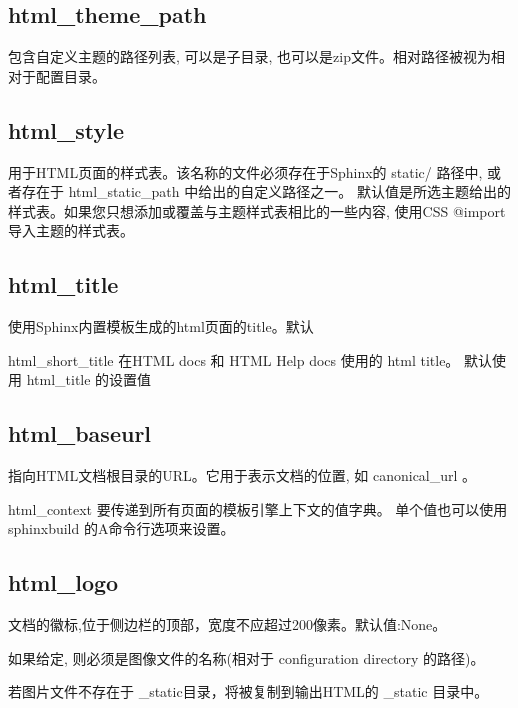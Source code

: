 \documentclass[a4paper,10pt,english]{sphinxmanual}
\begin{document}
\subsection{html\_theme\_path}
\label{\detokenize{sphinx_conf:html-theme-path}}
\sphinxAtStartPar
包含自定义主题的路径列表, 可以是子目录, 也可以是zip文件。相对路径被视为相对于配置目录。


\subsection{html\_style}
\label{\detokenize{sphinx_conf:html-style}}
\sphinxAtStartPar
用于HTML页面的样式表。该名称的文件必须存在于Sphinx的 static/ 路径中, 或者存在于 html\_static\_path 中给出的自定义路径之一。
默认值是所选主题给出的样式表。如果您只想添加或覆盖与主题样式表相比的一些内容, 使用CSS @import 导入主题的样式表。


\subsection{html\_title}
\label{\detokenize{sphinx_conf:html-title}}
\sphinxAtStartPar
使用Sphinx内置模板生成的html页面的title。默认 

\sphinxAtStartPar
html\_short\_title
在HTML docs 和 HTML Help docs 使用的 html title。
默认使用 html\_title 的设置值


\subsection{html\_baseurl}
\label{\detokenize{sphinx_conf:html-baseurl}}
\sphinxAtStartPar
指向HTML文档根目录的URL。它用于表示文档的位置, 如 canonical\_url 。

\sphinxAtStartPar
html\_context
要传递到所有页面的模板引擎上下文的值字典。
单个值也可以使用sphinx\sphinxhyphen{}build 的\sphinxhyphen{}A命令行选项来设置。


\subsection{html\_logo}
\label{\detokenize{sphinx_conf:html-logo}}
\sphinxAtStartPar
文档的徽标,位于侧边栏的顶部，宽度不应超过200像素。默认值:None。

\sphinxAtStartPar
如果给定, 则必须是图像文件的名称(相对于 configuration directory 的路径)。

\sphinxAtStartPar
若图片文件不存在于 \_static目录，将被复制到输出HTML的 \_static 目录中。
\end{document}
